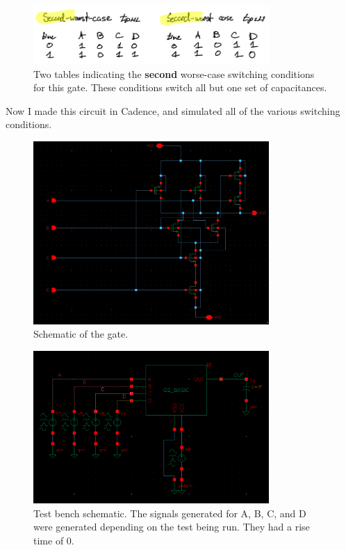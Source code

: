 \documentclass[11pt]{article}
\begin{document}
\begin{figure}[H]
\centering
  \includegraphics[width=0.8\textwidth]{q22worstcase.png}
  \caption{Two tables indicating the \textbf{second} worse-case switching conditions for this gate. These conditions switch all but one set of capacitances. }
\end{figure}

Now I made this circuit in Cadence, and simulated all of the various switching conditions.


\begin{figure}[H]
\centering
  \includegraphics[width=0.8\textwidth]{schem2.png}
  \caption{Schematic of the gate.}
\end{figure}

\begin{figure}[H]
\centering
  \includegraphics[width=0.8\textwidth]{schemtb2.png}
  \caption{Test bench schematic. The signals generated for A, B, C, and D were generated depending on the test being run. They had a rise time of 0.}
\end{figure}
\end{document}
